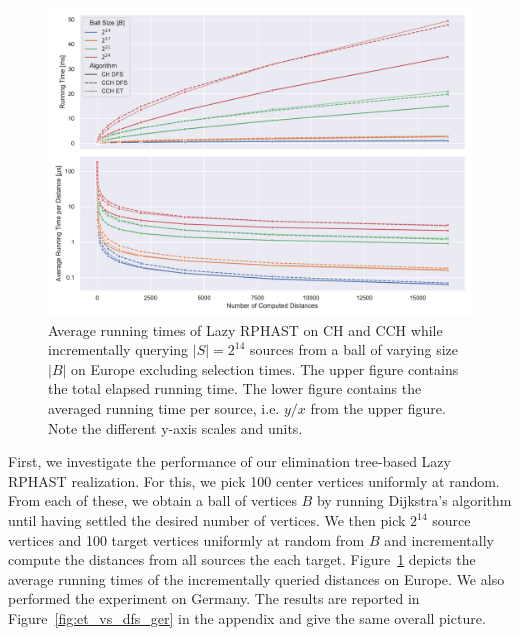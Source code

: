 \documentclass[a4paper, english, cleveref]{lipics-v2021}
\begin{document}
\begin{figure}
\centering
\includegraphics[width=\linewidth]{fig/lazy_rphast_et_vs_dfs.pdf}
\caption{
Average running times of Lazy RPHAST on CH and CCH while incrementally querying $|S| = 2^{14}$ sources from a ball of varying size $|B|$ on Europe excluding selection times.
The upper figure contains the total elapsed running time.
The lower figure contains the averaged running time per source, i.e. $y/x$ from the upper figure.
Note the different y-axis scales and units.
}\label{fig:et_vs_dfs}
\end{figure}

First, we investigate the performance of our elimination tree-based Lazy RPHAST realization.
For this, we pick 100 center vertices uniformly at random.
From each of these, we obtain a ball of vertices $B$ by running Dijkstra's algorithm until having settled the desired number of vertices.
We then pick $2^{14}$ source vertices and 100 target vertices uniformly at random from $B$ and incrementally compute the distances from all sources the each target.
Figure~\ref{fig:et_vs_dfs} depicts the average running times of the incrementally queried distances on Europe.
We also performed the experiment on Germany.
The results are reported in Figure~\ref{fig:et_vs_dfs_ger} in the appendix and give the same overall picture.
\end{document}
